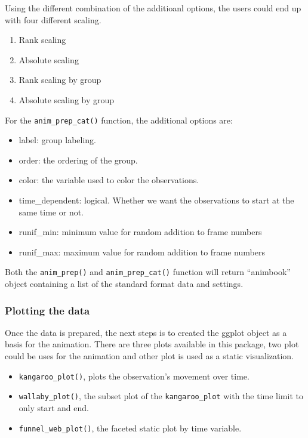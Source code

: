 Using the different combination of the additioanl options, the users could end up with four different scaling.

\begin{enumerate}
\def\labelenumi{\arabic{enumi}.}
\item
  Rank scaling
\item
  Absolute scaling
\item
  Rank scaling by group
\item
  Absolute scaling by group
\end{enumerate}

For the \texttt{anim\_prep\_cat()} function, the additional options are:

\begin{itemize}
\tightlist
\item
  label: group labeling.
\item
  order: the ordering of the group.
\item
  color: the variable used to color the observations.
\item
  time\_dependent: logical. Whether we want the observations to start at the same time or not.
\item
  runif\_min: minimum value for random addition to frame numbers
\item
  runif\_max: maximum value for random addition to frame numbers
\end{itemize}

Both the \texttt{anim\_prep()} and \texttt{anim\_prep\_cat()} function will return ``animbook'' object containing a list of the standard format data and settings.

\hypertarget{plotting-the-data}{%
\subsubsection{Plotting the data}\label{plotting-the-data}}

Once the data is prepared, the next steps is to created the ggplot object as a basis for the animation. There are three plots available in this package, two plot could be uses for the animation and other plot is used as a static visualization.

\begin{itemize}
\tightlist
\item
  \texttt{kangaroo\_plot()}, plots the observation's movement over time.
\item
  \texttt{wallaby\_plot()}, the subset plot of the \texttt{kangaroo\_plot} with the time limit to only start and end.
\item
  \texttt{funnel\_web\_plot()}, the faceted static plot by time variable.
\end{itemize}

